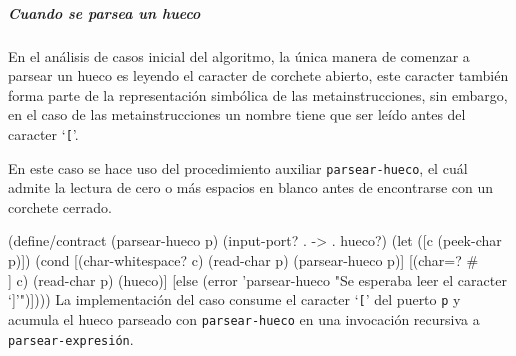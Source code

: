\documentclass[10pt,oneside,openany,letterpaper]{book}
\begin{document}
\subparagraph{Cuando se parsea un hueco} En el análisis de casos inicial del algoritmo, la única manera de comenzar a parsear un hueco es leyendo el caracter de corchete abierto, este caracter también forma parte de la representación simbólica de las metainstrucciones, sin embargo, en el caso de las metainstrucciones un nombre tiene que ser leído antes del caracter `{\tt{}[}'.

\nwenddocs{}\plusendmoddef
[(char=? #\\[ c)
 \LA{}Se leyó un corchete abierto~{\nwtagstyle{}\subpageref{NWlam9-Se*S-1}}\RA{}]
\nwendcode{}\nwdocspar

En este caso se hace uso del procedimiento auxiliar {\tt{}\protect{}\protect{}parsear-\protect{}hueco\protect{}}, el cuál admite la lectura de cero o más espacios en blanco antes de encontrarse con un corchete cerrado.

\nwenddocs{}\plusendmoddef
(define/contract (parsear-hueco p)
  (input-port? . -> . hueco?)
  (let ([c (peek-char p)])
    (cond [(char-whitespace? c)
           (read-char p)
           (parsear-hueco p)]
          [(char=? #\\] c)
           (read-char p)
           (hueco)]
          [else
           (error 'parsear-hueco "Se esperaba leer el caracter `]'")])))
\eatline
{}\nwendcode{}\nwdocspar
La implementación del caso consume el caracter `{\tt{}[}' del puerto {\tt{}p} y acumula el hueco parseado con {\tt{}\protect{}parsear-\protect{}hueco\protect{}} en una invocación recursiva a {\tt{}\protect{}parsear\protect{}-expresión}.
\end{document}
